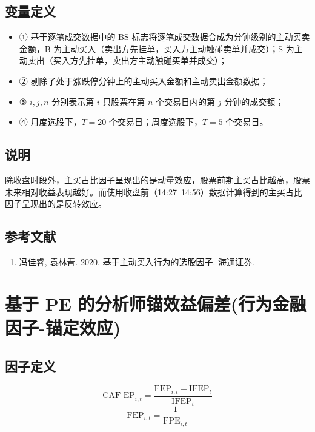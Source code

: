 \documentclass{article}
\begin{document}
\subsection{变量定义}
\begin{itemize}
    \item ① 基于逐笔成交数据中的 BS 标志将逐笔成交数据合成为分钟级别的主动买卖金额，B 为主动买入（卖出方先挂单，买入方主动触碰卖单并成交）；S 为主动卖出（买入方先挂单，卖出方主动触碰买单并成交）；
    \item ② 剔除了处于涨跌停分钟上的主动买入金额和主动卖出金额数据；
    \item ③ \( i, j, n \) 分别表示第 \( i \) 只股票在第 \( n \) 个交易日内的第 \( j \) 分钟的成交额；
    \item ④ 月度选股下，\( T = 20 \) 个交易日；周度选股下，\( T = 5 \) 个交易日。
\end{itemize}

\subsection{说明}
除收盘时段外，主买占比因子呈现出的是动量效应，股票前期主买占比越高，股票未来相对收益表现越好。而使用收盘前（14:27~14:56）数据计算得到的主买占比因子呈现出的是反转效应。

\subsection{参考文献}
\begin{enumerate}
    \item 冯佳睿, 袁林青. 2020. 基于主动买入行为的选股因子. 海通证券.
\end{enumerate}

\section{基于 PE 的分析师锚效益偏差(行为金融因子-锚定效应)}

\subsection{因子定义}

\begin{equation}
    \mathrm{CAF\_EP}_{i,t} = \frac{\mathrm{FEP}_{i,t} - \mathrm{IFEP}_t}{\mathrm{IFEP}_t}
\end{equation}
\begin{equation}
    \mathrm{FEP}_{i,t} = \frac{1}{\mathrm{FPE}_{i,t}}
\end{equation}
\end{document}

